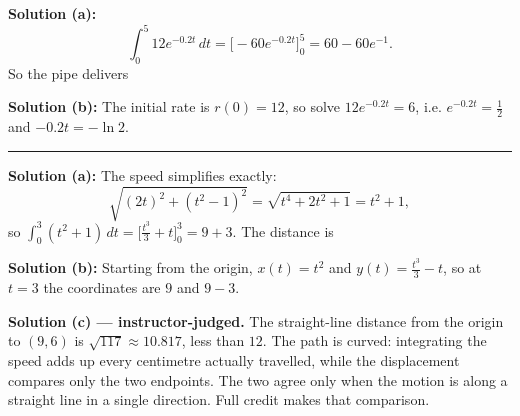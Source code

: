 \documentclass[12pt]{article}
\begin{document}

\textbf{Solution (a):} \[ \int_0^5 12e^{-0.2t}\,dt = \Big[-60e^{-0.2t}\Big]_0^5 = 60 - 60e^{-1}. \]
So the pipe delivers 

\textbf{Solution (b):} The initial rate is $r(0) = 12$, so solve $12e^{-0.2t} = 6$, i.e. $e^{-0.2t} = \tfrac{1}{2}$ and $-0.2t = -\ln 2$. 

\vspace{0.2cm}\noindent\rule{\linewidth}{0.2pt}\vspace{0.2cm}


\textbf{Solution (a):} The speed simplifies exactly:
\[ \sqrt{(2t)^2 + (t^2-1)^2} = \sqrt{t^4 + 2t^2 + 1} = t^2 + 1, \]
so $\displaystyle\int_0^3 (t^2+1)\,dt = \Big[\tfrac{t^3}{3} + t\Big]_0^3 = 9 + 3$. The distance is 

\textbf{Solution (b):} Starting from the origin, $x(t) = t^2$ and $y(t) = \tfrac{t^3}{3} - t$, so at $t = 3$ the coordinates are $9$ and $9 - 3$. 

\textbf{Solution (c) --- instructor-judged.} The straight-line distance from the origin to $(9,6)$ is $\sqrt{117} \approx 10.817$, less than $12$. The path is curved: integrating the speed adds up every centimetre actually travelled, while the displacement compares only the two endpoints. The two agree only when the motion is along a straight line in a single direction. Full credit makes that comparison.
\end{document}
